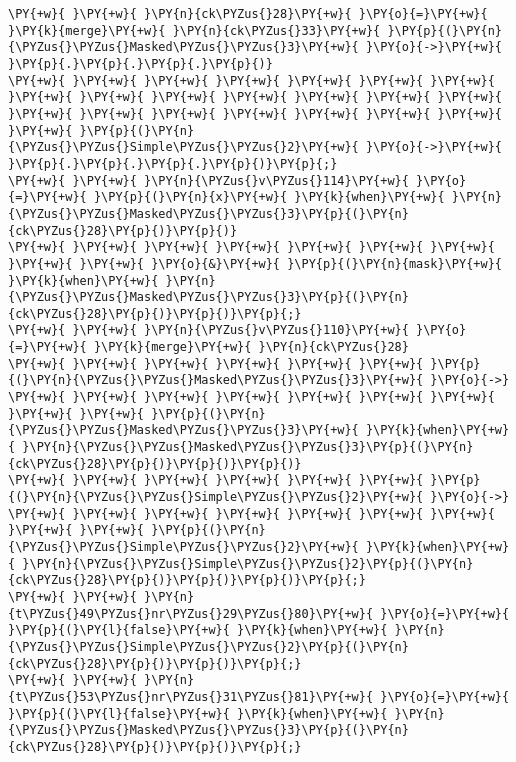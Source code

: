 \begin{Verbatim}[commandchars=\\\{\}]
\PY{+w}{ }\PY{+w}{ }\PY{n}{ck\PYZus{}28}\PY{+w}{ }\PY{o}{=}\PY{+w}{ }\PY{k}{merge}\PY{+w}{ }\PY{n}{ck\PYZus{}33}\PY{+w}{ }\PY{p}{(}\PY{n}{\PYZus{}\PYZus{}Masked\PYZus{}\PYZus{}3}\PY{+w}{ }\PY{o}{->}\PY{+w}{ }\PY{p}{.}\PY{p}{.}\PY{p}{.}\PY{p}{)}
\PY{+w}{ }\PY{+w}{ }\PY{+w}{ }\PY{+w}{ }\PY{+w}{ }\PY{+w}{ }\PY{+w}{ }\PY{+w}{ }\PY{+w}{ }\PY{+w}{ }\PY{+w}{ }\PY{+w}{ }\PY{+w}{ }\PY{+w}{ }\PY{+w}{ }\PY{+w}{ }\PY{+w}{ }\PY{+w}{ }\PY{+w}{ }\PY{+w}{ }\PY{+w}{ }\PY{+w}{ }\PY{p}{(}\PY{n}{\PYZus{}\PYZus{}Simple\PYZus{}\PYZus{}2}\PY{+w}{ }\PY{o}{->}\PY{+w}{ }\PY{p}{.}\PY{p}{.}\PY{p}{.}\PY{p}{)}\PY{p}{;}
\PY{+w}{ }\PY{+w}{ }\PY{n}{\PYZus{}v\PYZus{}114}\PY{+w}{ }\PY{o}{=}\PY{+w}{ }\PY{p}{(}\PY{n}{x}\PY{+w}{ }\PY{k}{when}\PY{+w}{ }\PY{n}{\PYZus{}\PYZus{}Masked\PYZus{}\PYZus{}3}\PY{p}{(}\PY{n}{ck\PYZus{}28}\PY{p}{)}\PY{p}{)}
\PY{+w}{ }\PY{+w}{ }\PY{+w}{ }\PY{+w}{ }\PY{+w}{ }\PY{+w}{ }\PY{+w}{ }\PY{+w}{ }\PY{+w}{ }\PY{o}{&}\PY{+w}{ }\PY{p}{(}\PY{n}{mask}\PY{+w}{ }\PY{k}{when}\PY{+w}{ }\PY{n}{\PYZus{}\PYZus{}Masked\PYZus{}\PYZus{}3}\PY{p}{(}\PY{n}{ck\PYZus{}28}\PY{p}{)}\PY{p}{)}\PY{p}{;}
\PY{+w}{ }\PY{+w}{ }\PY{n}{\PYZus{}v\PYZus{}110}\PY{+w}{ }\PY{o}{=}\PY{+w}{ }\PY{k}{merge}\PY{+w}{ }\PY{n}{ck\PYZus{}28}
\PY{+w}{ }\PY{+w}{ }\PY{+w}{ }\PY{+w}{ }\PY{+w}{ }\PY{+w}{ }\PY{p}{(}\PY{n}{\PYZus{}\PYZus{}Masked\PYZus{}\PYZus{}3}\PY{+w}{ }\PY{o}{->}
\PY{+w}{ }\PY{+w}{ }\PY{+w}{ }\PY{+w}{ }\PY{+w}{ }\PY{+w}{ }\PY{+w}{ }\PY{+w}{ }\PY{+w}{ }\PY{p}{(}\PY{n}{\PYZus{}\PYZus{}Masked\PYZus{}\PYZus{}3}\PY{+w}{ }\PY{k}{when}\PY{+w}{ }\PY{n}{\PYZus{}\PYZus{}Masked\PYZus{}\PYZus{}3}\PY{p}{(}\PY{n}{ck\PYZus{}28}\PY{p}{)}\PY{p}{)}\PY{p}{)}
\PY{+w}{ }\PY{+w}{ }\PY{+w}{ }\PY{+w}{ }\PY{+w}{ }\PY{+w}{ }\PY{p}{(}\PY{n}{\PYZus{}\PYZus{}Simple\PYZus{}\PYZus{}2}\PY{+w}{ }\PY{o}{->}
\PY{+w}{ }\PY{+w}{ }\PY{+w}{ }\PY{+w}{ }\PY{+w}{ }\PY{+w}{ }\PY{+w}{ }\PY{+w}{ }\PY{+w}{ }\PY{p}{(}\PY{n}{\PYZus{}\PYZus{}Simple\PYZus{}\PYZus{}2}\PY{+w}{ }\PY{k}{when}\PY{+w}{ }\PY{n}{\PYZus{}\PYZus{}Simple\PYZus{}\PYZus{}2}\PY{p}{(}\PY{n}{ck\PYZus{}28}\PY{p}{)}\PY{p}{)}\PY{p}{)}\PY{p}{;}
\PY{+w}{ }\PY{+w}{ }\PY{n}{t\PYZus{}49\PYZus{}nr\PYZus{}29\PYZus{}80}\PY{+w}{ }\PY{o}{=}\PY{+w}{ }\PY{p}{(}\PY{l}{false}\PY{+w}{ }\PY{k}{when}\PY{+w}{ }\PY{n}{\PYZus{}\PYZus{}Simple\PYZus{}\PYZus{}2}\PY{p}{(}\PY{n}{ck\PYZus{}28}\PY{p}{)}\PY{p}{)}\PY{p}{;}
\PY{+w}{ }\PY{+w}{ }\PY{n}{t\PYZus{}53\PYZus{}nr\PYZus{}31\PYZus{}81}\PY{+w}{ }\PY{o}{=}\PY{+w}{ }\PY{p}{(}\PY{l}{false}\PY{+w}{ }\PY{k}{when}\PY{+w}{ }\PY{n}{\PYZus{}\PYZus{}Masked\PYZus{}\PYZus{}3}\PY{p}{(}\PY{n}{ck\PYZus{}28}\PY{p}{)}\PY{p}{)}\PY{p}{;}
\end{Verbatim}
